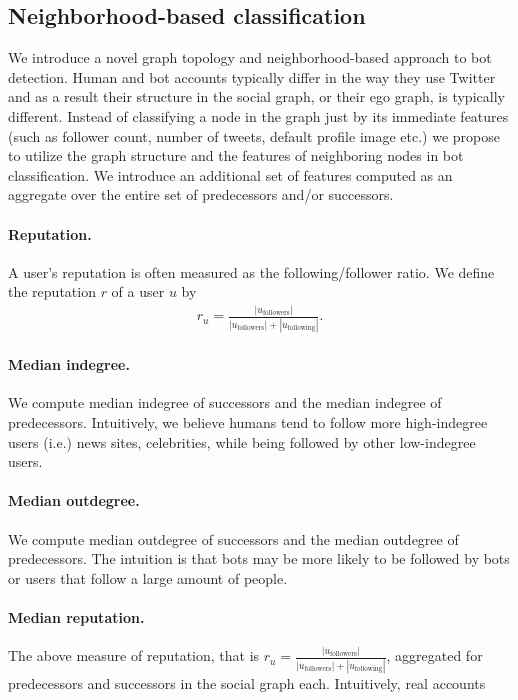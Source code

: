 \subsection{Neighborhood-based classification}
\label{sec:approach}

We introduce a novel graph topology and neighborhood-based approach to bot detection. Human and bot accounts typically differ in the way they use Twitter and as a result their structure in the social graph, or their ego graph, is typically different. Instead of classifying a node in the graph just by its immediate features (such as follower count, number of tweets, default profile image etc.) we propose to utilize the graph structure and the features of neighboring nodes in bot classification. We introduce an additional set of features computed as an aggregate over the entire set of predecessors and/or successors. 

\paragraph{Reputation.} A user's reputation is often measured as the following/follower ratio. We define the reputation $r$ of a user $u$ by
\begin{align*}
    r_u = \frac{ |u_\text{followers}| }{ |u_\text{followers}| + |u_\text{following}|}.
\end{align*}

\paragraph{Median indegree.} We compute median indegree of successors and the median indegree of predecessors. Intuitively, we believe humans tend to follow more high-indegree users (i.e.) news sites, celebrities, while being followed by other low-indegree users.

\paragraph{Median outdegree.} We compute median outdegree of successors and the median outdegree of predecessors. The intuition is that bots may be more likely to be followed by bots or users that follow a large amount of people.

\paragraph{Median reputation.} The above measure of reputation, that is $r_u = \frac{ |u_\text{followers}| }{ |u_\text{followers}| + |u_\text{following}|}$, aggregated for predecessors and successors in the social graph each. Intuitively, real accounts 

